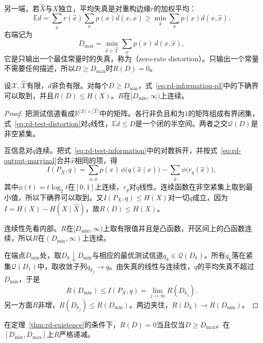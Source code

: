 另一端，若$\hat{X}$与$X$独立，平均失真是对重构边缘$r$的加权平均：
\[
  \mathbb{E}d=\sum_{\hat{x}}r(\hat{x})\sum_{x}p(x)d(x,\hat{x})\geq\min_{\hat{x}}\sum_{x}p(x)d(x,\hat{x}).
\]
右端记为
\begin{equation}
  D_{\max}=\min_{\hat{x}\in\hat{\mathcal{X}}}\sum_{x}p(x)\,d(x,\hat{x}),
  \label{eq:rd-dmax}
\end{equation}
它是只输出一个最佳常量时的失真，称为（zero-rate distortion）。只输出一个常量不需要任何描述，所以$D\geq D_{\max}$时$R(D)=0$。

\begin{theorem}
\label{thm:rd-existence}
设$\mathcal{X},\hat{\mathcal{X}}$有限，$d$非负有限。对每个$D\geq D_{\min}$，式~\eqref{eq:rd-information-rd}中的下确界可以取到，并且$R(D)\leq H(X)$。$R$在$[D_{\min},\infty)$上连续。
\end{theorem}

\begin{proof}
把测试信道看成$\mathbb{R}^{\lvert\mathcal{X}\rvert\times\lvert\hat{\mathcal{X}}\rvert}$中的矩阵。各行非负且和为$1$的矩阵组成有界闭集，式~\eqref{eq:rd-test-distortion}对$q$线性，$\mathbb{E}d\leq D$是一个闭的半空间。两者之交$\mathcal{Q}(D)$是非空紧集。

互信息对$q$连续。把式~\eqref{eq:rd-test-information}中的对数拆开，并按式~\eqref{eq:rd-output-marginal}合并$\hat{x}$相同的项，得
\[
  I(P_X,q)=\sum_{x,\hat{x}}p(x)\,\phi\bigl(q(\hat{x}\mid x)\bigr)-\sum_{\hat{x}}\phi\bigl(r_q(\hat{x})\bigr),
\]
其中$\phi(t)=t\log_2t$在$[0,1]$上连续，$r_q$对$q$线性。连续函数在非空紧集上取到最小值，所以下确界可以取到。又$I(P_X,q)\leq H(X)$对一切$q$成立，因为$I=H(X)-H(X\mid\hat{X})$，故$R(D)\leq H(X)$。

连续性先看内部。$R$在$[D_{\min},\infty)$上取有限值并且是凸函数，开区间上的凸函数连续，所以$R$在$(D_{\min},\infty)$上连续。

在端点$D_{\min}$处，取$D_k\downarrow D_{\min}$与相应的最优测试信道$q_k\in\mathcal{Q}(D_k)$。所有$q_k$落在紧集$\mathcal{Q}(D_1)$中，取收敛子列$q_{k_j}\to q$。由失真的线性与连续性，$q$的平均失真不超过$D_{\min}$，于是
\[
  R(D_{\min})\leq I(P_X,q)=\lim_{j\to\infty}R(D_{k_j}).
\]
另一方面$R$非增，$R(D_{k_j})\leq R(D_{\min})$。两边夹住，$R(D_k)\to R(D_{\min})$。
\end{proof}

\begin{theorem}[零码率失真]
\label{thm:rd-zero-rate}
在定理~\ref{thm:rd-existence}的条件下，$R(D)=0$当且仅当$D\geq D_{\max}$。在$[D_{\min},D_{\max}]$上$R$严格递减。
\end{theorem}

